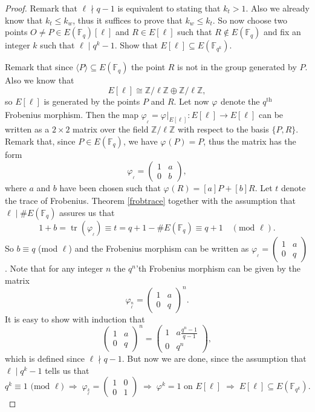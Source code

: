 \documentclass{article}
\numberwithin{equation}{section}
\theoremstyle{definition}
\newcommand{\ZZ}{{\mathbb Z}} %
\newcommand{\Zmod}[1]{\ZZ / #1\ZZ} %
\newcommand{\FF}[1]{{\mathbb F}_{#1}} %
\newcommand{\grgen}[1]{\langle #1 \rangle} %
\newcommand{\frob}[1][]{\varphi_{#1}} %
\newcommand{\tr}[1]{\operatorname{tr} \left(#1\right)} %
\begin{document}
\begin{proof}
Remark that $\ell \nmid q-1$ is equivalent to stating that $k_t > 1$. Also we already know that $k_t \leq k_w$, thus it suffices to prove that $k_w \leq k_t$. So now choose two points $O\neq P\in E(\FF{q})[\ell]$ and $R\in E[\ell]$ such that $R \not \in E(\FF{q})$ and fix an integer $k$ such that $\ell \mid q^k-1$. Show that $E[\ell] \subseteq E(\FF{q^k})$.\par  
Remark that since $\grgen{P} \subseteq E(\FF{q})$ the point $R$ is not in the group generated by $P$. Also we know that $$E[\ell] \cong \Zmod{\ell} \oplus \Zmod{\ell},$$ so $E[\ell]$ is generated by the points $P$ and $R$. Let now $\frob$ denote the $q^\text{th}$ Frobenius morphism. Then the map $\frob_\ell=\frob|_{E[\ell]}:E[\ell] \rightarrow E[\ell]$ can be written as a $2 \times 2$ matrix over the field $\Zmod{\ell}$ with respect to the basis $\{P,R\}$. Remark that, since $P \in E(\FF{q})$, we have $\frob(P)=P$, thus the matrix has the form $$\frob_\ell=\begin{pmatrix}  1 & a \\ 0 & b \end{pmatrix},$$ where $a$ and $b$ have been chosen such that $\frob(R)=[a]P+[b]R$. Let $t$ denote the trace of Frobenius. Theorem \ref{frobtrace} together with the assumption that $\ell \mid \#E(\FF{q})$ assures us that $$1+b= \tr{\frob_\ell} \equiv t = q+1-\#E(\FF{q}) \equiv q+1 \quad (\text{mod } \ell).$$ So $b \equiv q$ (mod $\ell$) and the Frobenius morphism can be written as $\frob_\ell = \begin{pmatrix} 1 & a \\ 0 & q \end{pmatrix}$. Note that for any integer $n$ the $q^n$'th Frobenius morphism can be given by the matrix $$\frob_\ell^n=\begin{pmatrix}1 & a \\ 0 & q \end{pmatrix}^n.$$ It is easy to show with induction that $$\begin{pmatrix} 1 & a \\ 0 & q \end{pmatrix}^n = \begin{pmatrix} 1 & a\frac{q^n-1}{q-1} \\ 0 & q^n\end{pmatrix},$$ which is defined since $\ell \nmid q-1$. But now we are done, since the assumption that $\ell \mid q^k-1$ tells us that $$q^k \equiv 1 \text{ (mod }\ell) \;\Longrightarrow\; \frob_\ell^k = \begin{pmatrix} 1 & 0 \\ 0 & 1 \end{pmatrix}\; \Longrightarrow\; \frob^k = 1 \text{ on } E[\ell]\;  \Longrightarrow\; E[\ell] \subseteq E(\FF{q^k}) .$$   
\end{proof}
\end{document}
